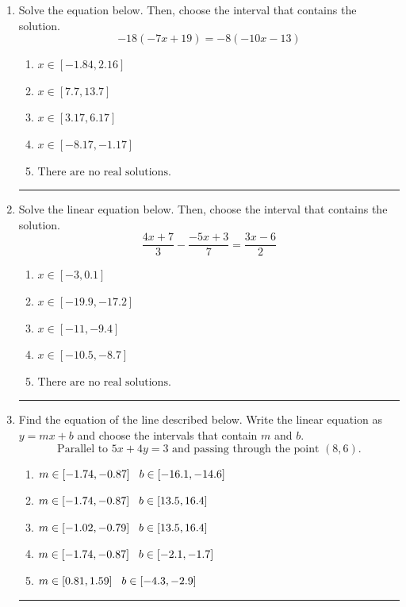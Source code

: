\documentclass[14pt]{extbook}
\newcommand{\litem}[1]{\item#1\hspace*{-1cm}\rule{\textwidth}{0.4pt}}
\begin{document}
\begin{enumerate}
\litem{
Solve the equation below. Then, choose the interval that contains the solution.\[ -18(-7x + 19) = -8(-10x -13) \]\begin{enumerate}[label=\Alph*.]
\item \( x \in [-1.84, 2.16] \)
\item \( x \in [7.7, 13.7] \)
\item \( x \in [3.17, 6.17] \)
\item \( x \in [-8.17, -1.17] \)
\item \( \text{There are no real solutions.} \)

\end{enumerate} }
\litem{
Solve the linear equation below. Then, choose the interval that contains the solution.\[ \frac{4x + 7}{3} - \frac{-5x + 3}{7} = \frac{3x -6}{2} \]\begin{enumerate}[label=\Alph*.]
\item \( x \in [-3, 0.1] \)
\item \( x \in [-19.9, -17.2] \)
\item \( x \in [-11, -9.4] \)
\item \( x \in [-10.5, -8.7] \)
\item \( \text{There are no real solutions.} \)

\end{enumerate} }
\litem{
Find the equation of the line described below. Write the linear equation as $ y=mx+b $ and choose the intervals that contain $m$ and $b$.\[ \text{Parallel to } 5 x + 4 y = 3 \text{ and passing through the point } (8, 6). \]\begin{enumerate}[label=\Alph*.]
\item \( m \in [-1.74, -0.87] \hspace*{3mm} b \in [-16.1, -14.6] \)
\item \( m \in [-1.74, -0.87] \hspace*{3mm} b \in [13.5, 16.4] \)
\item \( m \in [-1.02, -0.79] \hspace*{3mm} b \in [13.5, 16.4] \)
\item \( m \in [-1.74, -0.87] \hspace*{3mm} b \in [-2.1, -1.7] \)
\item \( m \in [0.81, 1.59] \hspace*{3mm} b \in [-4.3, -2.9] \)


\end{enumerate}}
\end{enumerate}
\end{document}

